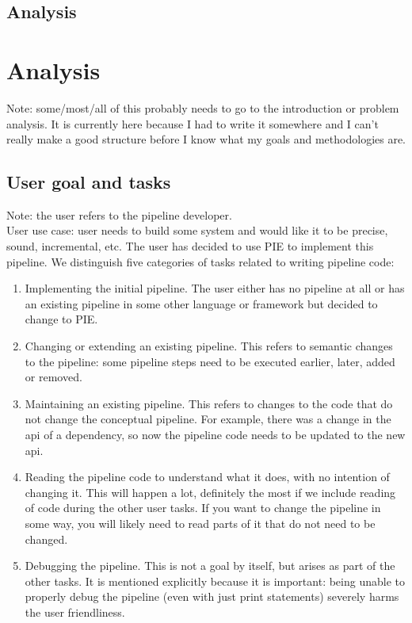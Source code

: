 
\subsection{Analysis}
\label{sec:evaluation__testing__analysis}


\section{Analysis}
\label{sec:evaluation__analysis}

Note: some/most/all of this probably needs to go to the introduction or problem analysis.
It is currently here because I had to write it somewhere and I can't really make a good structure before I know what my goals and methodologies are.

\subsection{User goal and tasks}
Note: the user refers to the pipeline developer.\\
User use case: user needs to build some system and would like it to be precise, sound, incremental, etc.
The user has decided to use PIE to implement this pipeline.
We distinguish five categories of tasks related to writing pipeline code:
\begin{enumerate}
  \item Implementing the initial pipeline.
  The user either has no pipeline at all or has an existing pipeline in some other language or framework but decided to change to PIE.
  \item Changing or extending an existing pipeline.
  This refers to semantic changes to the pipeline: some pipeline steps need to be executed earlier, later, added or removed.
  \item Maintaining an existing pipeline.
  This refers to changes to the code that do not change the conceptual pipeline.
  For example, there was a change in the api of a dependency, so now the pipeline code needs to be updated to the new api.
  \item Reading the pipeline code to understand what it does, with no intention of changing it.
  This will happen a lot, definitely the most if we include reading of code during the other user tasks.
  If you want to change the pipeline in some way, you will likely need to read parts of it that do not need to be changed.
  \item Debugging the pipeline.
  This is not a goal by itself, but arises as part of the other tasks.
  It is mentioned explicitly because it is important: being unable to properly debug the pipeline (even with just print statements) severely harms the user friendliness.
\end{enumerate}

